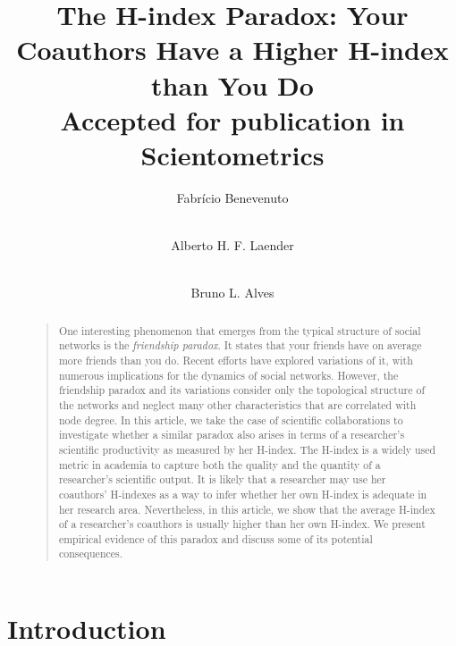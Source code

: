 \documentclass[smallextended]{svjour3}
\begin{document}
\title{The H-index Paradox: Your Coauthors Have a Higher H-index than You Do\\
{\tiny Accepted for publication in Scientometrics}}

\author{Fabr\'icio Benevenuto \and \\
        Alberto H. F. Laender  \and \\
        Bruno L. Alves
}



\maketitle
\begin{abstract}
\begin{quote}
One interesting phenomenon that emerges from the typical structure of social networks is the {\it friendship paradox}. It states that your friends have on average more friends than you do. Recent efforts have explored variations of it, with numerous implications for the dynamics of social networks. However, the friendship paradox and its variations consider only the topological structure of the networks and neglect many other characteristics that are correlated with node degree. In this article, we take the case of scientific collaborations to investigate whether a similar paradox also arises in terms of a researcher's scientific productivity as measured by her H-index. The H-index is a widely used metric in academia to capture both the quality and the quantity of a researcher's scientific output. It is likely that a researcher may use her coauthors' H-indexes as a way to infer whether her own H-index is adequate in her research area. Nevertheless, in this article, we show that the average H-index of a researcher's coauthors is usually higher than her own H-index. We present empirical evidence of this paradox and discuss some of its potential consequences.
\end{quote}
\end{abstract}

\section{Introduction}
\end{document}
